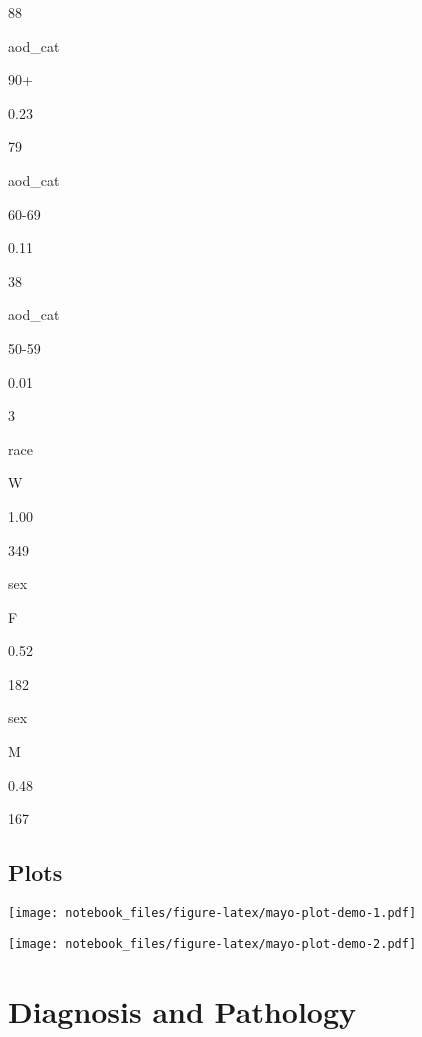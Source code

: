 \documentclass[]{book}
\newenvironment{Shaded}{\begin{snugshade}}{\end{snugshade}}
\newcommand{\DataTypeTok}[1]{\textcolor[rgb]{0.13,0.29,0.53}{#1}}
\newcommand{\DecValTok}[1]{\textcolor[rgb]{0.00,0.00,0.81}{#1}}
\newcommand{\KeywordTok}[1]{\textcolor[rgb]{0.13,0.29,0.53}{\textbf{#1}}}
\newcommand{\NormalTok}[1]{#1}
\newcommand{\OperatorTok}[1]{\textcolor[rgb]{0.81,0.36,0.00}{\textbf{#1}}}
\newcommand{\StringTok}[1]{\textcolor[rgb]{0.31,0.60,0.02}{#1}}
\begin{document}
88

aod\_cat

90+

0.23

79

aod\_cat

60-69

0.11

38

aod\_cat

50-59

0.01

3

race

W

1.00

349

sex

F

0.52

182

sex

M

0.48

167

\hypertarget{plots}{%
\subsection{Plots}\label{plots}}

\begin{Shaded}
\end{Shaded}

\texttt{[image: notebook\_files/figure-latex/mayo-plot-demo-1.pdf]}

\begin{Shaded}
\end{Shaded}

\texttt{[image: notebook\_files/figure-latex/mayo-plot-demo-2.pdf]}

\hypertarget{diagnosis-and-pathology}{%
\section{Diagnosis and Pathology}\label{diagnosis-and-pathology}}
\end{document}
